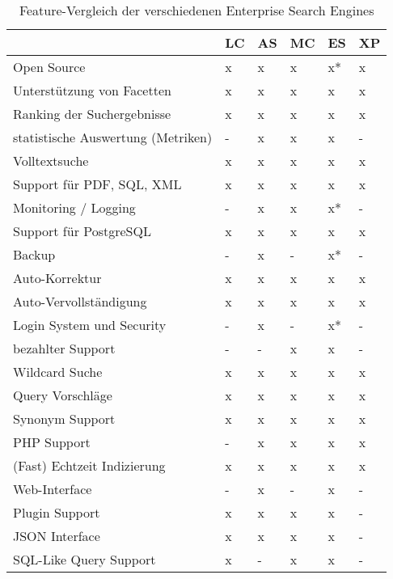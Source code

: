 \begin{table} %
	\centering
		\begin{tabular}{l | l | l | l | l | l}
		& \textbf{LC} & \textbf{AS} & \textbf{MC} & \textbf{ES}  & \textbf{XP} \\
        \hline
        Open Source                                 & x & x & x & x* & x \\
        Unterstützung von Facetten                  & x & x & x & x  & x \\
        Ranking der Suchergebnisse                  & x & x & x & x  & x \\
        statistische Auswertung (Metriken)          & - & x & x & x  & - \\
        Volltextsuche                               & x & x & x & x  & x \\
        Support für PDF, SQL, XML                   & x & x & x & x  & x \\
        Monitoring / Logging                        & - & x & x & x* & - \\
        Support für PostgreSQL                      & x & x & x & x  & x \\
        Backup                                      & - & x & - & x* & - \\
        Auto-Korrektur                              & x & x & x & x  & x \\
        Auto-Vervollständigung                      & x & x & x & x  & x \\
        Login System und Security                   & - & x & - & x* & - \\
        bezahlter Support                           & - & - & x & x  & - \\
        Wildcard Suche                              & x & x & x & x  & x \\
        Query Vorschläge                            & x & x & x & x  & x \\
        Synonym Support                             & x & x & x & x  & x \\
        PHP Support                                 & - & x & x & x  & x \\
        (Fast) Echtzeit Indizierung                 & x & x & x & x  & x \\
        Web-Interface                               & - & x & - & x  & - \\
        Plugin Support                              & x & x & x & x  & - \\
        JSON Interface                              & x & x & x & x  & - \\
        SQL-Like Query Support                      & x & - & x & x  & - \\
		\end{tabular}
	\caption{Feature-Vergleich der verschiedenen Enterprise Search Engines}
    \label{vglTable}


\end{table}
